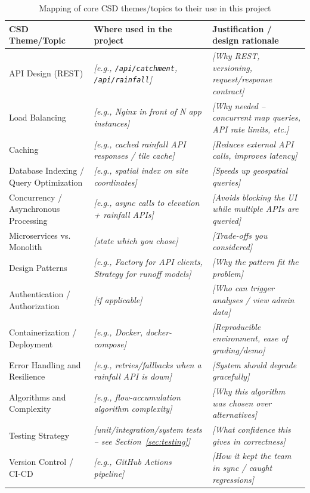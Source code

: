 \documentclass[manuscript,screen,review]{acmart}
\begin{document}
\begin{table}[t]
  \caption{Mapping of core CSD themes/topics to their use in this project}
  \label{tab:csd-themes}
  \begin{tabular}{p{2.8cm}p{5.2cm}p{6.5cm}}
    \toprule
    CSD Theme/Topic & Where used in the project & Justification / design rationale \\
    \midrule
    API Design (REST) & \textit{[e.g., \texttt{/api/catchment}, \texttt{/api/rainfall}]} & \textit{[Why REST, versioning, request/response contract]} \\
    Load Balancing & \textit{[e.g., Nginx in front of N app instances]} & \textit{[Why needed -- concurrent map queries, API rate limits, etc.]} \\
    Caching & \textit{[e.g., cached rainfall API responses / tile cache]} & \textit{[Reduces external API calls, improves latency]} \\
    Database Indexing / Query Optimization & \textit{[e.g., spatial index on site coordinates]} & \textit{[Speeds up geospatial queries]} \\
    Concurrency / Asynchronous Processing & \textit{[e.g., async calls to elevation + rainfall APIs]} & \textit{[Avoids blocking the UI while multiple APIs are queried]} \\
    Microservices vs. Monolith & \textit{[state which you chose]} & \textit{[Trade-offs you considered]} \\
    Design Patterns & \textit{[e.g., Factory for API clients, Strategy for runoff models]} & \textit{[Why the pattern fit the problem]} \\
    Authentication / Authorization & \textit{[if applicable]} & \textit{[Who can trigger analyses / view admin data]} \\
    Containerization / Deployment & \textit{[e.g., Docker, docker-compose]} & \textit{[Reproducible environment, ease of grading/demo]} \\
    Error Handling and Resilience & \textit{[e.g., retries/fallbacks when a rainfall API is down]} & \textit{[System should degrade gracefully]} \\
    Algorithms and Complexity & \textit{[e.g., flow-accumulation algorithm complexity]} & \textit{[Why this algorithm was chosen over alternatives]} \\
    Testing Strategy & \textit{[unit/integration/system tests -- see Section~\ref{sec:testing}]} & \textit{[What confidence this gives in correctness]} \\
    Version Control / CI-CD & \textit{[e.g., GitHub Actions pipeline]} & \textit{[How it kept the team in sync / caught regressions]} \\
    \bottomrule
  \end{tabular}
\end{table}
\end{document}
